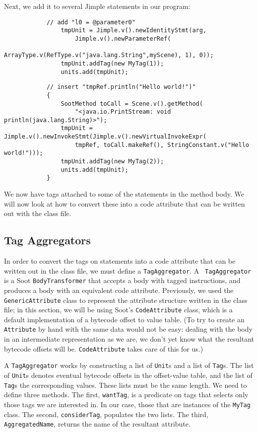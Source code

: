 \documentclass{article}
\begin{document}
Next, we add it to several Jimple statements in our program:

\begin{verbatim}
            // add "l0 = @parameter0"
                tmpUnit = Jimple.v().newIdentityStmt(arg,
                    Jimple.v().newParameterRef(
                        ArrayType.v(RefType.v("java.lang.String",myScene), 1), 0));
                tmpUnit.addTag(new MyTag(1));
                units.add(tmpUnit);
\end{verbatim}

\begin{verbatim}
            // insert "tmpRef.println("Hello world!")"
            {
                SootMethod toCall = Scene.v().getMethod(
                    "<java.io.PrintStream: void println(java.lang.String)>");
                tmpUnit = Jimple.v().newInvokeStmt(Jimple.v().newVirtualInvokeExpr(
                    tmpRef, toCall.makeRef(), StringConstant.v("Hello world!")));
                tmpUnit.addTag(new MyTag(2));
                units.add(tmpUnit);
            }
\end{verbatim}

We now have tags attached to some of the statements in the method body. We 
will now look at how to convert these into a code attribute that can be 
written out with the class file.

\subsection{Tag Aggregators}

In order to convert the tags on statements into a code attribute that can be 
written out in the class file, we must define a {\tt TagAggregator}. A {\tt 
TagAggregator} is a Soot {\tt BodyTransformer} that accepts a body with tagged 
instructions, and produces a body with an equivalent code attribute. 
Previously, we used the {\tt GenericAttribute} class to represent the 
attribute structure written in the class file; in this section, we will be 
using Soot's {\tt CodeAttribute} class, which is a default implementation of a 
bytecode offset to value table. (To try to create an {\tt Attribute} by hand 
with the same data would not be easy: dealing with the body in an intermediate 
representation as we are, we don't yet know what the resultant bytecode 
offsets will be. {\tt CodeAttribute} takes care of this for us.)

A {\tt TagAggregator} works by constructing a list of {\tt Unit}s and a list 
of {\tt Tag}s. The list of {\tt Unit}s denotes eventual bytecode offsets in 
the offset-value table, and the list of {\tt Tag}s the corresponding values. 
These lists must be the same length. We need to define three methods. The 
first, {\tt wantTag}, is a predicate on tags that selects only those tags we 
are interested in. In our case, those that are instances of the {\tt MyTag} 
class. The second, {\tt considerTag}, populates the two lists. The third, {\tt 
AggregatedName}, returns the name of the resultant attribute.
\end{document}
